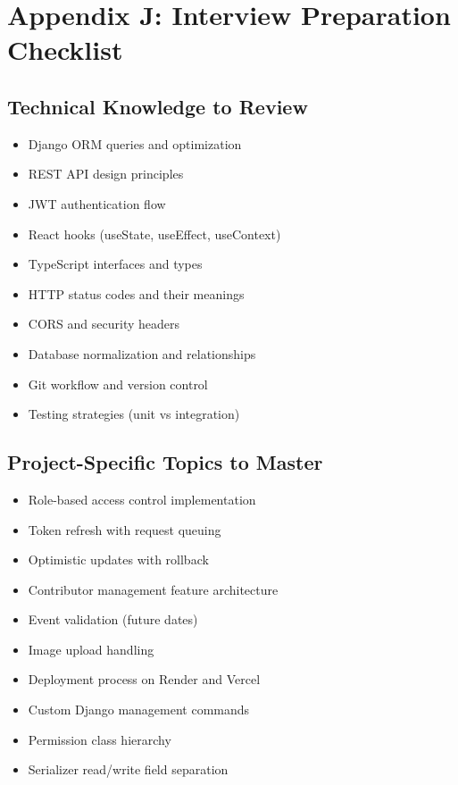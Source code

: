 \documentclass[11pt,a4paper]{article}
\begin{document}
\section{Appendix J: Interview Preparation Checklist}

\subsection{Technical Knowledge to Review}
\begin{itemize}[leftmargin=*]
    \item[$\square$] Django ORM queries and optimization
    \item[$\square$] REST API design principles
    \item[$\square$] JWT authentication flow
    \item[$\square$] React hooks (useState, useEffect, useContext)
    \item[$\square$] TypeScript interfaces and types
    \item[$\square$] HTTP status codes and their meanings
    \item[$\square$] CORS and security headers
    \item[$\square$] Database normalization and relationships
    \item[$\square$] Git workflow and version control
    \item[$\square$] Testing strategies (unit vs integration)
\end{itemize}

\subsection{Project-Specific Topics to Master}
\begin{itemize}[leftmargin=*]
    \item[$\square$] Role-based access control implementation
    \item[$\square$] Token refresh with request queuing
    \item[$\square$] Optimistic updates with rollback
    \item[$\square$] Contributor management feature architecture
    \item[$\square$] Event validation (future dates)
    \item[$\square$] Image upload handling
    \item[$\square$] Deployment process on Render and Vercel
    \item[$\square$] Custom Django management commands
    \item[$\square$] Permission class hierarchy
    \item[$\square$] Serializer read/write field separation
\end{itemize}
\end{document}
